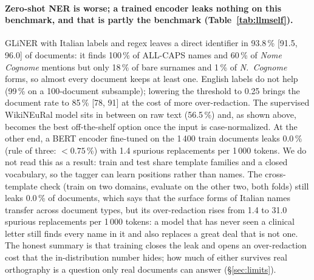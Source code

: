 \documentclass[11pt,a4paper]{article}
\begin{document}
\paragraph{Zero-shot NER is worse; a trained encoder leaks nothing on this benchmark, and that is partly the benchmark (Table~\ref{tab:llmself}).} GLiNER with Italian labels and regex leaves a direct identifier in 93.8\,\% [91.5, 96.0] of documents: it finds 100\,\% of ALL-CAPS names and 60\,\% of \emph{Nome Cognome} mentions but only 18\,\% of bare surnames and 1\,\% of \emph{N.~Cognome} forms, so almost every document keeps at least one. English labels do not help (99\,\% on a 100-document subsample); lowering the threshold to 0.25 brings the document rate to 85\,\% [78, 91] at the cost of more over-redaction. The supervised WikiNEuRal model sits in between on raw text (56.5\,\%) and, as shown above, becomes the best off-the-shelf option once the input is case-normalized. At the other end, a BERT encoder fine-tuned on the 1\,400 train documents leaks 0.0\,\% (rule of three: $<0.75$\,\%) with 1.4 spurious replacements per 1\,000 tokens. We do not read this as a result: train and test share template families and a closed vocabulary, so the tagger can learn positions rather than names. The cross-template check (train on two domains, evaluate on the other two, both folds) still leaks 0.0\,\% of documents, which says that the surface forms of Italian names transfer across document types, but its over-redaction rises from 1.4 to 31.0 spurious replacements per 1\,000 tokens: a model that has never seen a clinical letter still finds every name in it and also replaces a great deal that is not one. The honest summary is that training closes the leak and opens an over-redaction cost that the in-distribution number hides; how much of either survives real orthography is a question only real documents can answer (\S\ref{sec:limits}).


\end{document}
